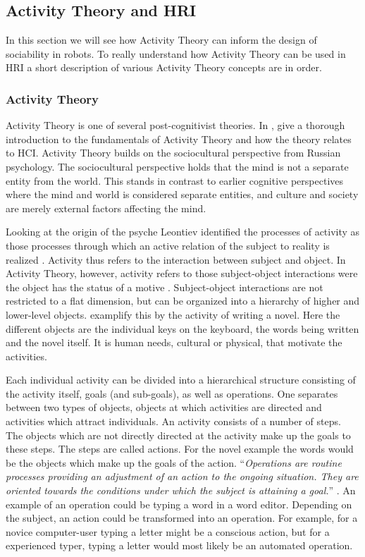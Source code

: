 \subsection{Activity Theory and HRI}
In this section we will see how Activity Theory can inform the design of sociability in robots. To really understand how Activity Theory can be used in HRI a short description of various Activity Theory concepts are in order.

\subsubsection{Activity Theory}

Activity Theory is one of several post-cognitivist theories. In , \textcite{Kaptelinin2012} give a thorough introduction to the fundamentals of Activity Theory and how the theory relates to HCI. Activity Theory builds on the sociocultural perspective from Russian psychology. The sociocultural perspective holds that the mind is not a separate entity from the world. This stands in contrast to earlier cognitive perspectives where the mind and world is considered separate entities, and culture and society are merely external factors affecting the mind.

Looking at the origin of the psyche Leontiev identified the processes of activity as those processes through which an active relation of the subject to reality is realized \parencite{Kaptelinin2012}. Activity thus refers to the interaction between subject and object. In Activity Theory, however, activity refers to those subject-object interactions were the object has the status of a motive \parencite{Kaptelinin2012}. Subject-object interactions are not restricted to a flat dimension, but can be organized into a hierarchy of higher and lower-level objects. \textcite{Kaptelinin2012} examplify this by the activity of writing a novel. Here the different objects are the individual keys on the keyboard, the words being written and the novel itself. It is human needs, cultural or physical, that motivate the activities. 

Each individual activity can be divided into a hierarchical structure consisting of the activity itself, goals (and sub-goals), as well as operations. One separates between two types of objects, objects at which activities are directed and activities which attract individuals. An activity consists of a number of steps. The objects which are not directly directed at the activity make up the goals to these steps. The steps are called actions. For the novel example the words would be the objects which make up the goals of the action. ``\textit{Operations are routine processes providing an adjustment of an action to the ongoing situation. They are oriented towards the conditions under which the subject is attaining a goal.}'' \parencite[][27]{Kaptelinin2012}. An example of an operation could be typing a word in a word editor. Depending on the subject, an action could be transformed into an operation. For example, for a novice computer-user typing a letter might be a conscious action, but for a experienced typer, typing a letter would most likely be an automated operation.

